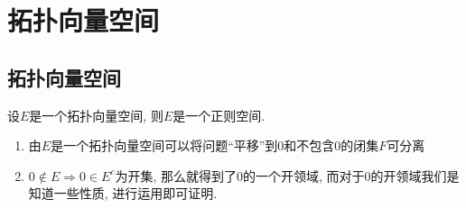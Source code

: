 \chapter{拓扑向量空间}
    \section{拓扑向量空间}
    \begin{theorem}\label{thm:拓扑向量空间是正则空间}
        设$E$是一个拓扑向量空间, 则$E$是一个正则空间.
    \end{theorem}
    \begin{analysis}
        \begin{enumerate}
            \item 由$E$是一个拓扑向量空间可以将问题“平移”到0和不包含0的闭集$F$可分离
            \item $0\notin E \Rightarrow 0\in E^c$为开集, 那么就得到了0的一个开领域, 而对于0的开领域我们是知道一些性质, 进行运用即可证明.
        \end{enumerate}
    \end{analysis}
